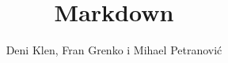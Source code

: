 \documentclass{beamer}
\begin{document}
\title{Markdown}
\author{Deni Klen, Fran Grenko i Mihael Petranović}
\maketitle

\newpage
\end{document}
